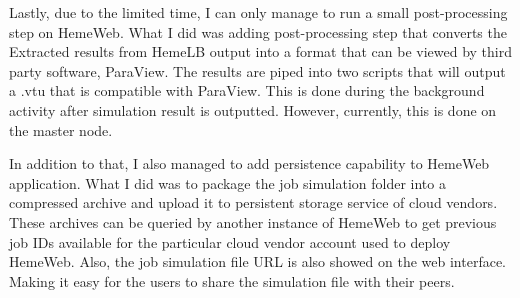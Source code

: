 Lastly, due to the limited time, I can only manage to run a small post-processing step on HemeWeb. What I did was adding post-processing step that converts the Extracted results from HemeLB output into a format that can be viewed by third party software, ParaView. The results are piped into two scripts that will output a .vtu that is compatible with ParaView. This is done during the background activity after simulation result is outputted. However, currently, this is done on the master node.

In addition to that, I also managed to add persistence capability to HemeWeb application. What I did was to package the job simulation folder into a compressed archive and upload it to persistent storage service of cloud vendors. These archives can be queried by another instance of HemeWeb to get previous job IDs available for the particular cloud vendor account used to deploy HemeWeb.  Also, the job simulation file URL is also showed on the web interface. Making it easy for the users to share the simulation file with their peers.





